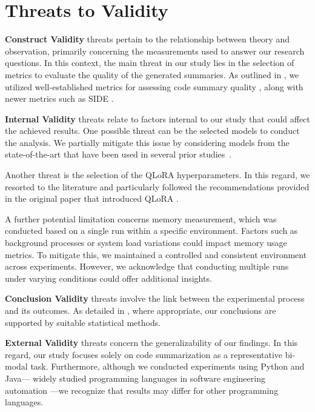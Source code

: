 
\section{Threats to Validity}
\label{sec:threats}

\textbf{Construct Validity} threats pertain to the relationship between theory and observation, primarily concerning the measurements used to answer our research questions. In this context, the main threat in our study lies in the selection of metrics to evaluate the quality of the generated summaries. As outlined in , we utilized well-established metrics for assessing code summary quality \cite{haque2022semantic}, along with newer metrics such as SIDE \cite{mastropaolo2024evaluating}.


\textbf{Internal Validity} threats relate to factors internal to our study that could affect the achieved results. One possible threat can be the selected models to conduct the analysis. We partially mitigate this issue by considering models from the state-of-the-art that have been used in several prior studies~\cite{virk2024enhancing,zhu2024effectiveness,yang2024synthesizing,li2023structured}. 


Another threat is the selection of the QLoRA hyperparameters. In this regard, we resorted to the literature and particularly followed the recommendations provided in the original paper that introduced QLoRA \cite{dettmers2024qlora}. %

A further potential limitation concerns memory measurement, which was conducted based on a single run within a specific environment. Factors such as background processes or system load variations could impact memory usage metrics. To mitigate this, we maintained a controlled and consistent environment across experiments. However, we acknowledge that conducting multiple runs under varying conditions could offer additional insights.

\textbf{Conclusion Validity} threats involve the link between the experimental process and its outcomes. As detailed in , where appropriate, our conclusions are supported by suitable statistical methods.


\textbf{External Validity} threats concern the generalizability of our findings.  In this regard, our study focuses solely on code summarization as a representative bi-modal task. Furthermore, although we conducted experiments using Python and Java— widely studied programming languages in software engineering automation \cite{hou2023large,deepseek,codellama}—we recognize that results may differ for other programming languages.
